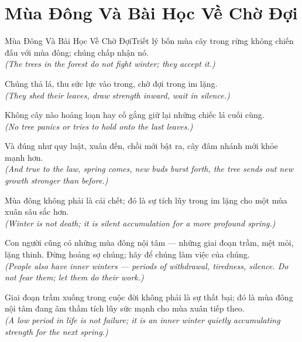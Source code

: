 \section{Mùa Đông Và Bài Học Về Chờ Đợi}
\begin{truyen}{Mùa Đông Và Bài Học Về Chờ Đợi}{Triết lý bốn mùa}
 cây trong rừng không chiến đấu với mùa đông; chúng chấp nhận nó.\\[4pt]
\textit{(The trees in the forest do not fight winter; they accept it.)}

Chúng thả lá, thu sức lực vào trong, chờ đợi trong im lặng.\\[4pt]
\textit{(They shed their leaves, draw strength inward, wait in silence.)}

Không cây nào hoảng loạn hay cố gắng giữ lại những chiếc lá cuối cùng.\\[4pt]
\textit{(No tree panics or tries to hold onto the last leaves.)}

Và đúng như quy luật, xuân đến, chồi mới bật ra, cây đâm nhánh mới khỏe mạnh hơn.\\[4pt]
\textit{(And true to the law, spring comes, new buds burst forth, the tree sends out new growth stronger than before.)}

Mùa đông không phải là cái chết; đó là sự tích lũy trong im lặng cho một mùa xuân sâu sắc hơn.\\[4pt]
\textit{(Winter is not death; it is silent accumulation for a more profound spring.)}

Con người cũng có những mùa đông nội tâm --- những giai đoạn trầm, mệt mỏi, lặng thinh. Đừng hoảng sợ chúng; hãy để chúng làm việc của chúng.\\[4pt]
\textit{(People also have inner winters --- periods of withdrawal, tiredness, silence. Do not fear them; let them do their work.)}

\end{truyen}
\begin{baihoc}
  Giai đoạn trầm xuống trong cuộc đời không phải là sự thất bại; đó là mùa đông nội tâm đang âm thầm tích lũy sức mạnh cho mùa xuân tiếp theo.\\[4pt]
  \textit{(A low period in life is not failure; it is an inner winter quietly accumulating strength for the next spring.)}
\end{baihoc}
